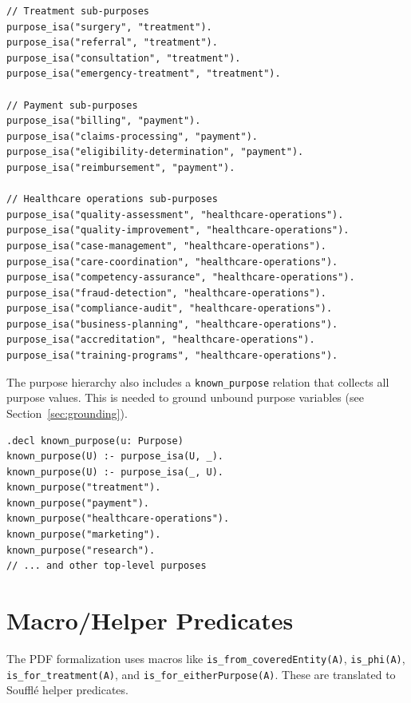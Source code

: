 \documentclass[11pt,letterpaper]{article}
\begin{document}
\begin{lstlisting}[style=soufflestyle,caption={Purpose hierarchy (selected entries)}]
// Treatment sub-purposes
purpose_isa("surgery", "treatment").
purpose_isa("referral", "treatment").
purpose_isa("consultation", "treatment").
purpose_isa("emergency-treatment", "treatment").

// Payment sub-purposes
purpose_isa("billing", "payment").
purpose_isa("claims-processing", "payment").
purpose_isa("eligibility-determination", "payment").
purpose_isa("reimbursement", "payment").

// Healthcare operations sub-purposes
purpose_isa("quality-assessment", "healthcare-operations").
purpose_isa("quality-improvement", "healthcare-operations").
purpose_isa("case-management", "healthcare-operations").
purpose_isa("care-coordination", "healthcare-operations").
purpose_isa("competency-assurance", "healthcare-operations").
purpose_isa("fraud-detection", "healthcare-operations").
purpose_isa("compliance-audit", "healthcare-operations").
purpose_isa("business-planning", "healthcare-operations").
purpose_isa("accreditation", "healthcare-operations").
purpose_isa("training-programs", "healthcare-operations").
\end{lstlisting}

The purpose hierarchy also includes a \texttt{known\_purpose} relation that collects all purpose values. This is needed to ground unbound purpose variables (see Section~\ref{sec:grounding}).

\begin{lstlisting}[style=soufflestyle,caption={known\_purpose for grounding}]
.decl known_purpose(u: Purpose)
known_purpose(U) :- purpose_isa(U, _).
known_purpose(U) :- purpose_isa(_, U).
known_purpose("treatment").
known_purpose("payment").
known_purpose("healthcare-operations").
known_purpose("marketing").
known_purpose("research").
// ... and other top-level purposes
\end{lstlisting}


\section{Macro/Helper Predicates}
\label{sec:macros}

The PDF formalization uses macros like \texttt{is\_from\_coveredEntity(A)}, \texttt{is\_phi(A)}, \texttt{is\_for\_treatment(A)}, and \texttt{is\_for\_eitherPurpose(A)}. These are translated to Souffl\'{e} helper predicates.
\end{document}
